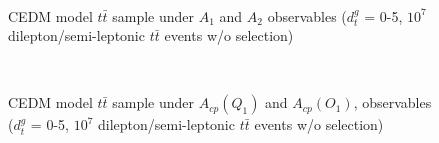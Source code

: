 			\begin{figure}[H]
			\centering
			    \\
			\caption{CEDM model $t\bar{t}$ sample under $A_1$ and $A_2$ observables ($d_t^g$ = 0-5, $10^7$ dilepton/semi-leptonic $t\bar{t}$ events w/o selection)}
			\label{Obs:fig:CEDM_1993}
			\end{figure}
			\FloatBarrier

			\begin{figure}[H]
			\centering
			    \\
			\caption{CEDM model $t\bar{t}$ sample under $A_{cp}(Q_1)$ and $A_{cp}(O_1)$, observables ($d_t^g$ = 0-5, $10^7$ dilepton/semi-leptonic $t\bar{t}$ events w/o selection)}
			\label{Obs:fig:CEDM_1998}
			\end{figure}
			\FloatBarrier

